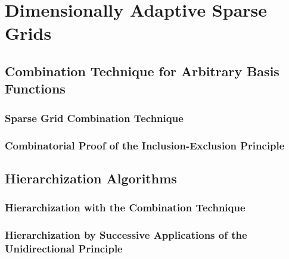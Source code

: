 \section{Dimensionally Adaptive Sparse Grids}

\blindtext{}

\subsection{Combination Technique for Arbitrary Basis Functions}

\blindtext{}

\subsubsection{Sparse Grid Combination Technique}

\blindtext{}

\subsubsection{Combinatorial Proof of the Inclusion-Exclusion Principle}

\blindtext{}

\subsection{Hierarchization Algorithms}

\blindtext{}

\subsubsection{Hierarchization with the Combination Technique}

\blindtext{}

\subsubsection{%
  Hierarchization by Successive Applications of the Unidirectional Principle%
}

\blindtext{}
